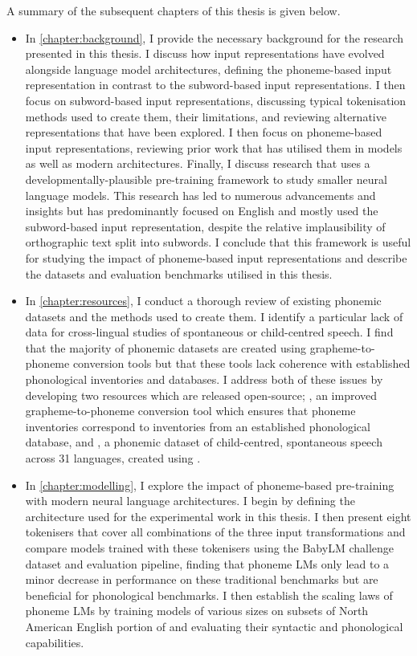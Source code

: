 A summary of the subsequent chapters of this thesis is given below.

\begin{itemize}
    \item In \cref{chapter:background}, I provide the necessary background for the research presented in this thesis. I discuss how input representations have evolved alongside language model architectures, defining the phoneme-based input representation in contrast to the subword-based input representations. I then focus on subword-based input representations, discussing typical tokenisation methods used to create them, their limitations, and reviewing alternative representations that have been explored. I then focus on phoneme-based input representations, reviewing prior work that has utilised them in \ngram models as well as modern architectures. Finally, I discuss research that uses a developmentally-plausible pre-training framework to study smaller neural language models. This research has led to numerous advancements and insights but has predominantly focused on English and mostly used the subword-based input representation, despite the relative implausibility of orthographic text split into subwords. I conclude that this framework is useful for studying the impact of phoneme-based input representations and describe the datasets and evaluation benchmarks utilised in this thesis.
    \item In \cref{chapter:resources}, I conduct a thorough review of existing phonemic datasets and the methods used to create them. I identify a particular lack of data for cross-lingual studies of spontaneous or child-centred speech. I find that the majority of phonemic datasets are created using grapheme-to-phoneme conversion tools but that these tools lack coherence with established phonological inventories and databases. I address both of these issues by developing two resources which are released open-source; \gpp, an improved grapheme-to-phoneme conversion tool which ensures that phoneme inventories correspond to inventories from an established phonological database, and \ipachildes, a phonemic dataset of child-centred, spontaneous speech across 31 languages, created using \gpp.
    \item In \cref{chapter:modelling}, I explore the impact of phoneme-based pre-training with modern neural language architectures. I begin by defining the architecture used for the experimental work in this thesis. I then present eight tokenisers that cover all combinations of the three input transformations and compare models trained with these tokenisers using the BabyLM challenge dataset and evaluation pipeline, finding that phoneme LMs only lead to a minor decrease in performance on these traditional benchmarks but are beneficial for phonological benchmarks. I then establish the scaling laws of phoneme LMs by training models of various sizes on subsets of North American English portion of \ipachildes and evaluating their syntactic and phonological capabilities.

\end{itemize}
